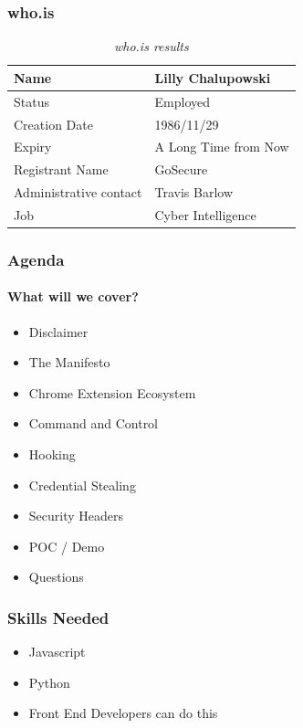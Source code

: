 \documentclass[aspectratio=169]{beamer}
\begin{document}
\begin{frame}
  \frametitle{who.is}
  \begin{table}
    \caption{\textit{who.is results}}
    \begin{tabularx}{\textwidth}{|X|X|}
      \hline
      Name & Lilly Chalupowski \\
      \hline
      Status & Employed \\
      \hline
      Creation Date & 1986/11/29 \\
      \hline
      Expiry & A Long Time from Now \\
      \hline
      Registrant Name & GoSecure \\
      \hline
      Administrative contact & Travis Barlow \\
      \hline
      Job & Cyber Intelligence \\
      \hline
    \end{tabularx}
  \end{table}
\end{frame}
\begin{frame}
  \frametitle{Agenda}
  \framesubtitle{What will we cover?}
  \begin{itemize}
  \item Disclaimer
  \item The Manifesto
  \item Chrome Extension Ecosystem
  \item Command and Control
  \item Hooking
  \item Credential Stealing
  \item Security Headers
  \item POC / Demo
  \item Questions
  \end{itemize}
\end{frame}
\begin{frame}
  \frametitle{Skills Needed}
  \begin{itemize}
  \item Javascript
  \item Python
  \item Front End Developers can do this
  \end{itemize}
\end{frame}
\end{document}
